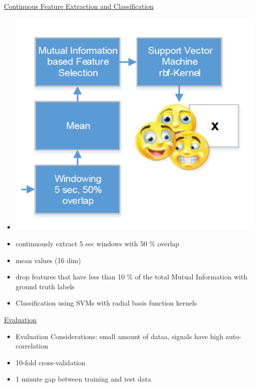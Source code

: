\documentclass[a4paper,10pt,oneside]{article}
\begin{document}
\underline{Continuous Feature Extraction and Classification} \\
	\begin{itemize}
		\item[] \includegraphics[scale=0.25]{Grafiken/2132.png}
		\item continuously extract 5 sec windows with 50 \% overlap
		\item mean values (16 dim)
		\item drop features that have less than 10 \% of the total Mutual Information with ground truth labels
		\item Classification using SVMs with radial basis function kernels
	\end{itemize}
	

\underline{Evaluation} \\
	\begin{itemize}
		\item Evaluation Considerations: small amount of dataa, signals have high auto-correlation
		\item 10-fold cross-validation
		\item 1 minute gap between training and test data
	\end{itemize}
	
\end{document}
